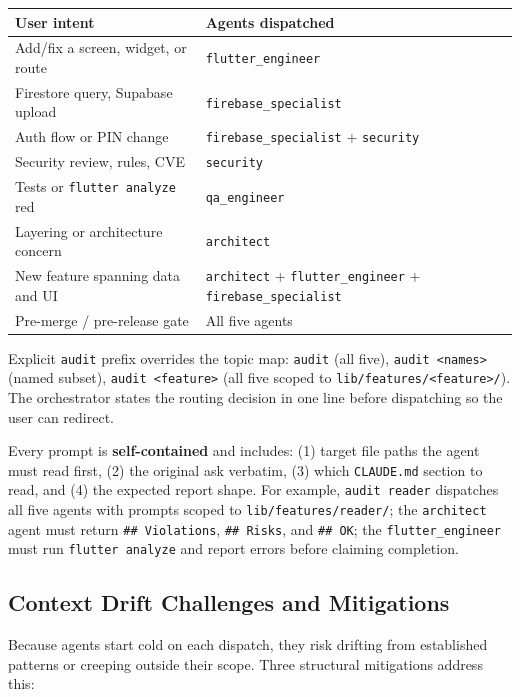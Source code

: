\documentclass[11pt,a4paper]{article}
\begin{document}
\vspace{4pt}
\begin{tabularx}{\textwidth}{@{}L{6.0cm} L{7.8cm}@{}}
  \toprule
  \textbf{User intent} & \textbf{Agents dispatched} \\
  \midrule
  Add/fix a screen, widget, or route & \texttt{flutter\_engineer} \\
  Firestore query, Supabase upload & \texttt{firebase\_specialist} \\
  Auth flow or PIN change & \texttt{firebase\_specialist} + \texttt{security} \\
  Security review, rules, CVE & \texttt{security} \\
  Tests or \texttt{flutter analyze} red & \texttt{qa\_engineer} \\
  Layering or architecture concern & \texttt{architect} \\
  New feature spanning data and UI & \texttt{architect} + \texttt{flutter\_engineer} + \texttt{firebase\_specialist} \\
  Pre-merge / pre-release gate & All five agents \\
  \bottomrule
\end{tabularx}
\vspace{2pt}

Explicit \texttt{audit} prefix overrides the topic map: \texttt{audit} (all five),
\texttt{audit <names>} (named subset), \texttt{audit <feature>} (all five scoped to
\texttt{lib/features/<feature>/}). The orchestrator states the routing decision in one
line before dispatching so the user can redirect.

Every prompt is \textbf{self-contained} and includes: (1) target file paths the agent
must read first, (2) the original ask verbatim, (3) which \texttt{CLAUDE.md} section
to read, and (4) the expected report shape. For example, \texttt{audit reader} dispatches
all five agents with prompts scoped to \texttt{lib/features/reader/}; the
\texttt{architect} agent must return \texttt{\#\# Violations}, \texttt{\#\# Risks}, and
\texttt{\#\# OK}; the \texttt{flutter\_engineer} must run \texttt{flutter analyze} and
report errors before claiming completion.

\subsection{Context Drift Challenges and Mitigations}

Because agents start cold on each dispatch, they risk drifting from established patterns
or creeping outside their scope. Three structural mitigations address this:
\end{document}

